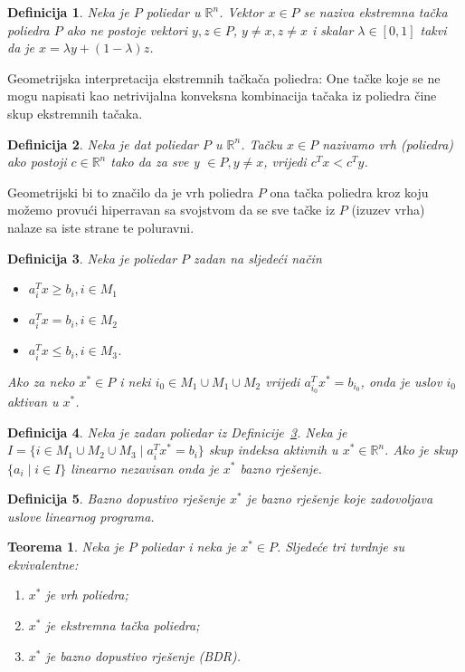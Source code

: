 \documentclass[a4paper, utf8, 11pt, colorlinks]{article}
\newtheorem{definition}{Definicija}
\newtheorem{thm}{Teorema}
\begin{document}
\begin{definition}
   Neka je $P$ poliedar u $\mathbb{R}^n$.  Vektor $x \in P$ se naziva ekstremna tačka poliedra $P$
   ako ne postoje vektori $y, z \in P$, $y \neq x, z \neq x$ i skalar $\lambda \in [0, 1]$ takvi da je  $x = \lambda y + (1-\lambda)z$.
\end{definition}
Geometrijska interpretacija ekstremnih tačkača poliedra:  One tačke koje se ne mogu napisati kao netrivijalna konveksna kombinacija tačaka iz poliedra čine skup ekstremnih tačaka. 
 
\begin{definition}
   Neka je dat poliedar $P$ u $\mathbb{R}^n$. Tačku $x \in P$ nazivamo vrh (poliedra) ako postoji $c \in \mathbb{R}^n$ tako da za sve y $\in P, y \neq x$, vrijedi $c^T x < c^T y$. 
\end{definition}
Geometrijski bi to značilo da je vrh poliedra $P$ ona tačka poliedra  kroz koju možemo provući hiperravan sa svojstvom da se sve tačke iz $P$ (izuzev vrha) nalaze sa iste strane te poluravni.

\begin{definition}\label{dfn:lp_aktivan}
   Neka je poliedar $P$ zadan na sljedeći način
   \begin{itemize}
       \item $a_i^T x \geq b_i, i \in M_1$
       \item $a_i^T x = b_i, i \in M_2 $
       \item $a_i^T x \leq b_i, i \in M_3 $. 
   \end{itemize}
   Ako za neko $x^* \in P$ i neki $i_0 \in M_1 \cup M_1 \cup M_2$ vrijedi 
   $a_{i_0}^T x^* = b_{i_0}$, onda je uslov $i_0$ aktivan u $x^*$. 
\end{definition}

\begin{definition}
      Neka je zadan poliedar iz Definicije~\ref{dfn:lp_aktivan}. Neka je 
      $I = \{ i \in M_1 \cup M_2 \cup M_3 \mid a_i^T x^* = b_i \}$  skup indeksa aktivnih u $x^*\in \mathbb{R}^n$.  Ako je skup $\{ a_i \mid i \in I \}$ linearno nezavisan onda je $x^*$ bazno rješenje. 
\end{definition}

\begin{definition}
	 Bazno dopustivo rješenje $x^*$ je bazno rješenje koje zadovoljava  uslove linearnog programa. 
\end{definition}

\begin{thm}
   Neka je $P$ poliedar i neka je $x^* \in P$. Sljedeće tri tvrdnje su ekvivalentne:
   \begin{enumerate}
       \item $x^*$ je vrh poliedra;
       \item $x^*$ je ekstremna tačka poliedra;
       \item $x^*$ je bazno dopustivo rješenje (BDR).
   \end{enumerate}
\end{thm}
\end{document}

